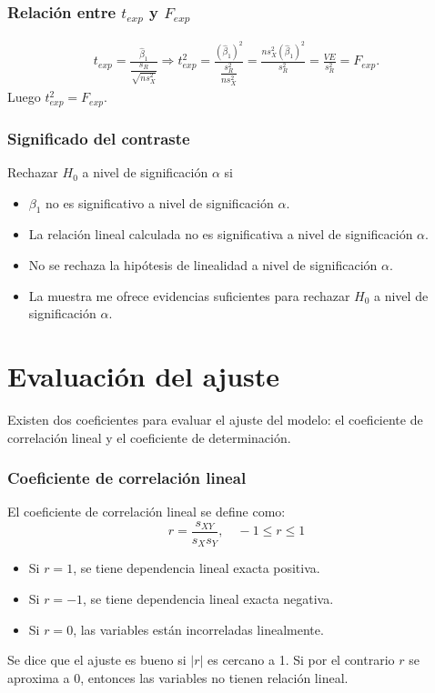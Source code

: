 \subsubsection{Relación entre $t_{exp}$ y $F_{exp}$}
\begin{align*}
    t_{exp} = \frac{\widehat{\beta}_1}{\dfrac{s_R}{\sqrt{ns_X^2}}} \Longrightarrow t_{exp}^2 = \frac{(\widehat{\beta}_1)^2}{\dfrac{s_R^2}{ns_X^2}} = \frac{n s_X^2 (\widehat{\beta}_1)^2}{s_R^2} = \frac{VE}{s_R^2} = F_{exp}.
\end{align*}
Luego $\boxed{t_{exp}^2 = F_{exp}.}$

\subsubsection{Significado del contraste}
\noindent Rechazar $H_0$ a nivel de significación $\alpha$ si
\begin{itemize}
    \item $\beta_1$ no es significativo a nivel de significación $\alpha$.
    \item La relación lineal calculada no es significativa a nivel de significación $\alpha$.
    \item No se rechaza la hipótesis de linealidad a nivel de significación $\alpha$.
    \item La muestra me ofrece evidencias suficientes para rechazar $H_0$ a nivel de significación $\alpha$.
\end{itemize}

\section{Evaluación del ajuste}
\noindent Existen dos coeficientes para evaluar el ajuste del modelo: el coeficiente de correlación lineal y el coeficiente de determinación.

\subsubsection{Coeficiente de correlación lineal}
\noindent El coeficiente de correlación lineal se define como:
$$r = \frac{s_{XY}}{s_X s_Y}, \quad -1 \leq r \leq 1$$
\begin{itemize}
    \item Si $r = 1$, se tiene dependencia lineal exacta positiva.
    \item Si $r = -1$, se tiene dependencia lineal exacta negativa.
    \item Si $r = 0$, las variables están incorreladas linealmente.
\end{itemize}
Se dice que el ajuste es bueno si $|r|$ es cercano a 1.
Si por el contrario $r$ se aproxima a 0, entonces las variables no tienen relación lineal.

